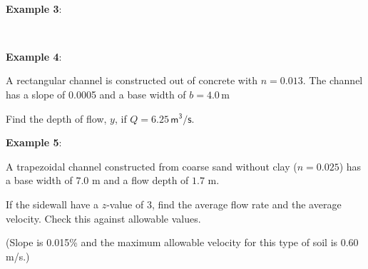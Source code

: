 \documentclass[10pt, oneside]{amsart}
\begin{document}





\vfill

\pagebreak~\pagebreak



\textbf{Example 3}:






\par\vfill
~\par





\vfill
\pagebreak



\textbf{Example 4}:

A rectangular channel is constructed out of concrete
with $n=0.013$. The channel has a slope of 0.0005 and a base width of $b=4.0\,\text{m}$  \par\bigskip
Find the depth of flow,
$y$, if $Q=6.25\,\mathsf{m^3/s}$.

\par\vfill

\pagebreak


\textbf{Example 5}:

A trapezoidal channel constructed from coarse sand without clay
($n = 0.025$) has a base width of $7.0$ m and a flow depth of $1.7$ m.
\par\medskip
If the sidewall have a $z$-value of 3, find the average flow
rate and the average velocity. Check this against allowable values.\par\medskip
(Slope is 0.015\% and the maximum allowable velocity for this type of soil is $0.60$ m/s.)
\end{document}
